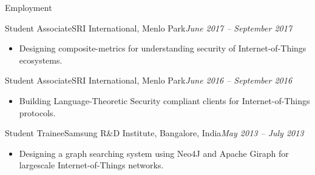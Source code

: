\documentclass[]{mcdowellcv}
\begin{document}
\begin{cvsection}{Employment}
\begin{cvsubsection}{Student Associate}{SRI International, Menlo Park}{\textit{June 2017 -- September 2017}}			
			\begin{itemize}
				\item Designing composite-metrics for understanding security of Internet-of-Things ecosystems.
			\end{itemize}
		\end{cvsubsection}
        \begin{cvsubsection}{Student Associate}{SRI International, Menlo Park}{\textit{June 2016 -- September 2016}}			
			\begin{itemize}
				\item Building Language-Theoretic Security compliant clients for Internet-of-Things protocols.
				\end{itemize}
		\end{cvsubsection}
		\begin{cvsubsection}{Student Trainee}{Samsung R\&D Institute, Bangalore, India}{\textit{May 2013 -- July 2013}}			
			\begin{itemize}
				\item Designing a graph searching system using Neo4J and Apache Giraph for largescale Internet-of-Things networks.
			\end{itemize}
		\end{cvsubsection}
	\end{cvsection}
\end{document}
